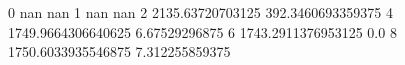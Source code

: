 0 nan nan
1 nan nan
2 2135.63720703125 392.3460693359375
4 1749.9664306640625 6.67529296875
6 1743.2911376953125 0.0
8 1750.6033935546875 7.312255859375
